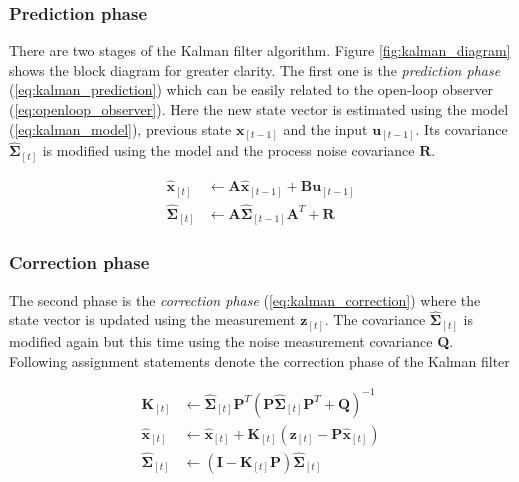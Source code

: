 \subsubsection{Prediction phase}

There are two stages of the Kalman filter algorithm. Figure \ref{fig:kalman_diagram} shows the block diagram for greater clarity. The first one is the \textit{prediction phase} (\ref{eq:kalman_prediction}) which can be easily related to the open-loop observer (\ref{eq:openloop_observer}). Here the new state vector is estimated using the model (\ref{eq:kalman_model}), previous state $\textbf{\^x}_{[t-1]}$ and the input $\textbf{u}_{[t-1]}$. Its covariance $\hat{\boldsymbol{\Sigma}}_{[t]}$ is modified using the model and the process noise covariance $\textbf{R}$.

\begin{equation}
\begin{split}
\hat{\textbf{x}}_{[t]} &\leftarrow \textbf{A}\hat{\textbf{x}}_{[t-1]} + \textbf{B}\textbf{u}_{[t-1]} \\
\hat{\boldsymbol{\Sigma}}_{[t]} &\leftarrow \textbf{A}\hat{\boldsymbol{\Sigma}}_{[t-1]}\textbf{A}^{T} + \textbf{R}
\end{split}
\label{eq:kalman_prediction}
\end{equation}    

\subsubsection{Correction phase}
The second phase is the \textit{correction phase} (\ref{eq:kalman_correction}) where the state vector is updated using the measurement $\textbf{z}_{[t]}$. The covariance $\hat{\boldsymbol{\Sigma}}_{[t]}$ is modified again but this time using the noise measurement covariance \textbf{Q}. Following assignment statements denote the correction phase of the Kalman filter

\begin{equation}
\begin{split}
\textbf{K}_{[t]} &\leftarrow \hat{\boldsymbol{\Sigma}}_{[t]}\textbf{P}^{T}\left(\textbf{P}\hat{\boldsymbol{\Sigma}}_{[t]}\textbf{P}^{T} + \textbf{Q}\right)^{-1} \\
\hat{\textbf{x}}_{[t]} &\leftarrow \hat{\textbf{x}}_{[t]} + \textbf{K}_{[t]}\left(\textbf{z}_{[t]} - \textbf{P}\hat{\textbf{x}}_{[t]}\right) \\
\hat{\boldsymbol{\Sigma}}_{[t]} &\leftarrow \left(\mathbf{I} - \textbf{K}_{[t]}\textbf{P}\right)\hat{\boldsymbol{\Sigma}}_{[t]}
\end{split}
\label{eq:kalman_correction}
\end{equation}

